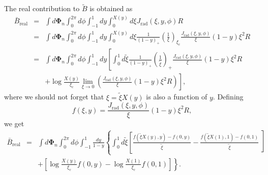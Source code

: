 \documentclass{letter}
\newcommand{\tmmathbf}[1]{\ensuremath{\boldsymbol{#1}}}
\newcommand{\tmop}[1]{\ensuremath{\operatorname{#1}}}
\begin{document}
The real contribution to $\tilde{B}$ is obtained as
\begin{eqnarray}
  \bar{B}_{\tmop{real}} & = & \int d \tmmathbf{\Phi}_n \int_0^{2 \pi} d \phi
  \int_{- 1}^1 d y \int_0^{X (y)} d \xi J_{\tmop{rad}} (\xi, y, \phi) R
  \nonumber\\
  & = & \int d \tmmathbf{\Phi}_n \int_0^{2 \pi} d \phi \int_{- 1}^1 d y
  \int_0^{X (y)} d \xi \frac{1}{(1 - y)_+}  \left( \frac{1}{\xi}
  \right)_{\xi_c}  \frac{J_{\tmop{rad}} (\xi, y, \phi)}{\xi} (1 - y) \xi^2 R
  \nonumber\\
  & = & \int d \tmmathbf{\Phi}_n \int_0^{2 \pi} d \phi \int_{- 1}^1 d y
  \left[ \int_0^1 d \tilde{\xi}  \frac{1}{(1 - y)_+}  \left(
  \frac{1}{\tilde{\xi}} \right)_+  \frac{J_{\tmop{rad}} (\xi, y, \phi)}{\xi}
  (1 - y) \xi^2 R \right. \nonumber\\
  &  & \left. + \log \frac{X (y)}{\xi_c} \lim_{\xi \rightarrow 0} \left(
  \frac{J_{\tmop{rad}} (\xi, y, \phi)}{\xi} (1 - y) \xi^2 R \right) \right], 
\end{eqnarray}
where we should not forget that $\xi = \tilde{\xi} X (y)$ is also a function
of $y$. Defining
\begin{equation}
  f (\xi, y) = \frac{J_{\tmop{rad}} (\xi, y, \phi)}{\xi} (1 - y) \xi^2 R,
\end{equation}
we get
\begin{eqnarray}
  \bar{B}_{\tmop{real}} & = & \int d \tmmathbf{\Phi}_n \int_0^{2 \pi} d \phi
  \int_{- 1}^1 \frac{d y}{1 - y} \left\{ \int_0^1 d \tilde{\xi}  \left[
  \frac{f ( \tilde{\xi} X (y), y) - f (0, y)}{\tilde{\xi}} - \frac{f (
  \tilde{\xi} X (1), 1) - f (0, 1)}{\tilde{\xi}} \left]  \right. \right.
  \right. \nonumber\\
  &  & \left. + \left[ \log \frac{X (y)}{\xi_c} f (0, y) - \log \frac{X
  (1)}{\xi_c} f (0, 1) \right] \right\} . 
\end{eqnarray}
\end{document}
